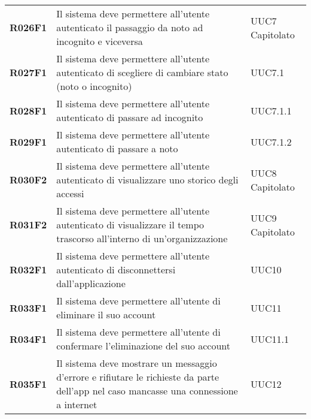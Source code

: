 \documentclass[../analisi-dei-requisiti.tex]{subfiles}
\begin{document}
\begin{longtable}[H]{>{\centering\bfseries}m{3cm} >{\centering}m{10cm} >{\centering\arraybackslash}m{3cm}}
  R026F1                  & Il sistema deve permettere all'utente autenticato il passaggio da noto ad incognito e viceversa                                                                                    & UUC7 Capitolato               \\
  R027F1                  & Il sistema deve permettere all'utente autenticato di scegliere di cambiare stato (noto o incognito)                                                                                & UUC7.1                        \\
  R028F1                  & Il sistema deve permettere all'utente autenticato di passare ad incognito                                                                                                          & UUC7.1.1                      \\
  R029F1                  & Il sistema deve permettere all'utente autenticato di passare a noto                                                                                                                & UUC7.1.2                      \\
  R030F2                  & Il sistema deve permettere all'utente autenticato di visualizzare uno storico degli accessi                                                                                        & UUC8 Capitolato               \\
  R031F2                  & Il sistema deve permettere all'utente autenticato di visualizzare il tempo trascorso all'interno di un'organizzazione                                                              & UUC9 Capitolato               \\
  R032F1                  & Il sistema deve permettere all'utente autenticato di disconnettersi dall'applicazione                                                                                              & UUC10                         \\
  R033F1                  & Il sistema deve permettere all'utente di eliminare il suo account                                                                                                                  & UUC11                         \\
  R034F1                  & Il sistema deve permettere all'utente di confermare l'eliminazione del suo account                                                                                                 & UUC11.1                       \\
  R035F1                  & Il sistema deve mostrare un messaggio d'errore e rifiutare le richieste da parte dell'app nel caso mancasse una connessione a internet                                             & UUC12                         \\


\end{longtable}
\end{document}
